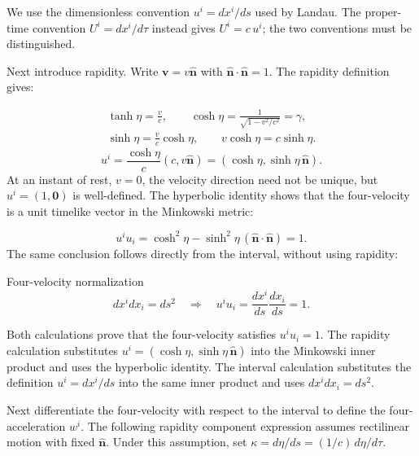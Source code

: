 \documentclass[a4paper,12pt]{article}
\begin{document}
We use the dimensionless convention $u^i=dx^i/ds$ used by Landau. The proper-time convention $U^i=dx^i/d\tau$ instead gives $U^i=c\,u^i$; the two conventions must be distinguished.

Next introduce rapidity. Write $\boldsymbol v=v\widehat{\boldsymbol n}$ with $\widehat{\boldsymbol n}\cdot\widehat{\boldsymbol n}=1$. The rapidity definition gives:

\begin{equation}\label{rapidity-identities}
\begin{gathered}\tanh\eta=\frac vc,\qquad\cosh\eta=\frac1{\sqrt{1-v^2/c^2}}=\gamma,\\\sinh\eta=\frac vc\cosh\eta,\qquad v\cosh\eta=c\sinh\eta.\end{gathered}
\end{equation}
\begin{equation}\label{velocity-rapidity}
u^i=\frac{\cosh\eta}{c}(c,v\widehat{\boldsymbol n})=(\cosh\eta,\sinh\eta\,\widehat{\boldsymbol n}).
\end{equation}
At an instant of rest, $v=0$, the velocity direction need not be unique, but $u^i=(1,\boldsymbol 0)$ is well-defined. The hyperbolic identity shows that the four-velocity is a unit timelike vector in the Minkowski metric:

\begin{equation}\label{velocity-unit-rapidity}
u^iu_i=\cosh^2\eta-\sinh^2\eta\,(\widehat{\boldsymbol n}\cdot\widehat{\boldsymbol n})=1.
\end{equation}
The same conclusion follows directly from the interval, without using rapidity:

\begin{resultBox}{Four-velocity normalization}
\begin{equation}\label{velocity-unit-interval}
dx^i dx_i=ds^2\quad\Longrightarrow\quad u^iu_i=\frac{dx^i}{ds}\frac{dx_i}{ds}=1.
\end{equation}
\end{resultBox}

Both calculations prove that the four-velocity satisfies $u^iu_i=1$. The rapidity calculation substitutes $u^i=(\cosh\eta,\sinh\eta\,\widehat{\boldsymbol n})$ into the Minkowski inner product and uses the hyperbolic identity. The interval calculation substitutes the definition $u^i=dx^i/ds$ into the same inner product and uses $dx^idx_i=ds^2$.

Next differentiate the four-velocity with respect to the interval to define the four-acceleration $w^i$. The following rapidity component expression assumes rectilinear motion with fixed $\widehat{\boldsymbol n}$. Under this assumption, set $\kappa=d\eta/ds=(1/c)\,d\eta/d\tau$.
\end{document}
